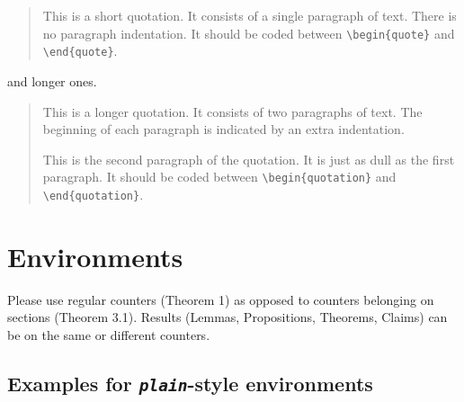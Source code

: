 \documentclass[qe,nameyear,draft]{econsocart}
\theoremstyle{plain}
\begin{document}
\begin{quote}
This is a short quotation. It consists of a
single paragraph of text. There is no paragraph
indentation. It should be coded between \texttt{{\textbackslash}begin\{quote\}} and \texttt{{\textbackslash}end\{quote\}}.
\end{quote}

and longer ones.


\begin{quotation}
This is a longer quotation.  It consists of two paragraphs
of text.  The beginning of each paragraph is indicated
by an extra indentation.

This is the second paragraph of the quotation.  It is just
as dull as the first paragraph. It should be coded between \verb|\begin{quotation}| and \verb|\end{quotation}|.
\end{quotation}
\section{Environments}

Please use regular counters (Theorem 1) as opposed to counters belonging on sections (Theorem 3.1). Results (Lemmas, Propositions, Theorems, Claims) can be on the same or different counters.

\subsection{Examples for \textit{\texttt{plain}}-style environments}
\end{document}
